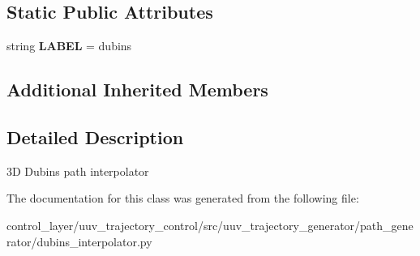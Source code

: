 \subsection*{Static Public Attributes}
\begin{DoxyCompactItemize}
\item 
\mbox{\label{classuuv__trajectory__generator_1_1path__generator_1_1dubins__interpolator_1_1DubinsInterpolator_aa447cb1a312ea49b9c85e07a2b9dff3c}} 
string {\bfseries L\+A\+B\+EL} = \textquotesingle{}dubins\textquotesingle{}
\end{DoxyCompactItemize}
\subsection*{Additional Inherited Members}


\subsection{Detailed Description}
\begin{DoxyVerb}3D Dubins path interpolator
\end{DoxyVerb}
 

The documentation for this class was generated from the following file\+:\begin{DoxyCompactItemize}
\item 
control\+\_\+layer/uuv\+\_\+trajectory\+\_\+control/src/uuv\+\_\+trajectory\+\_\+generator/path\+\_\+generator/dubins\+\_\+interpolator.\+py\end{DoxyCompactItemize}
